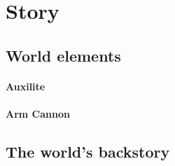 \documentclass[../Main.tex]{subfiles}
\begin{document}
\section{Story}


\subsection{World elements}

\paragraph{Auxilite} 

\paragraph{Arm Cannon}

\subsection{The world's backstory}
\end{document}
